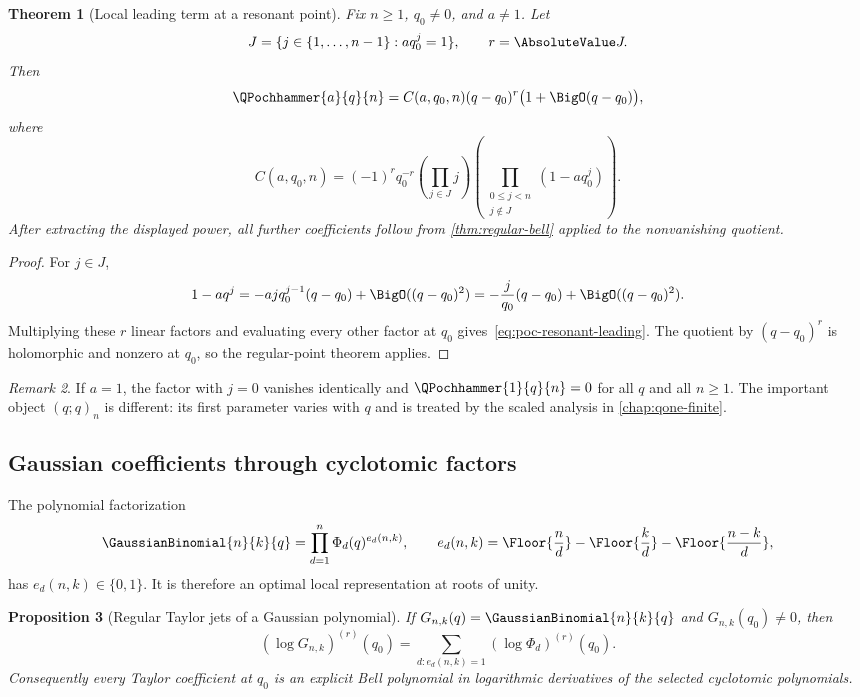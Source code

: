 \documentclass[11pt,oneside]{article}
\newtheorem{theorem}{Theorem}[section]
\newtheorem{proposition}[theorem]{Proposition}
\theoremstyle{definition}
\theoremstyle{remark}
\newtheorem{remark}[theorem]{Remark}
\let\reportsubsection\subsection
\let\section\reportsubsection
\begin{document}
\begin{theorem}[Local leading term at a resonant point]\label{thm:poc-resonance}
Fix $n\ge1$, $q_0\ne0$, and $a\ne1$.  Let
\[
 J=\{j\in\{1,\ldots,n-1\}: aq_0^j=1\},
 \qquad r=\AbsoluteValue J.
\]
Then
\[
 \QPochhammer{a}{q}{n}=C(a,q_0,n)(q-q_0)^r\bigl(1+\BigO(q-q_0)\bigr),
\]
where
\begin{equation}\label{eq:poc-resonant-leading}
 C(a,q_0,n)=(-1)^r q_0^{-r}
 \left(\prod_{j\in J}j\right)
 \left(\prod_{\substack{0\le j<n\\j\notin J}}(1-aq_0^j)\right).
\end{equation}
After extracting the displayed power, all further coefficients follow from
\cref{thm:regular-bell} applied to the nonvanishing quotient.
\end{theorem}

\begin{proof}
For $j\in J$,
\[
 1-aq^j=-ajq_0^{j-1}(q-q_0)+\BigO((q-q_0)^2)
        =-\frac{j}{q_0}(q-q_0)+\BigO((q-q_0)^2).
\]
Multiplying these $r$ linear factors and evaluating every other factor at
$q_0$ gives~\eqref{eq:poc-resonant-leading}.  The quotient by
$(q-q_0)^r$ is holomorphic and nonzero at $q_0$, so the regular-point theorem
applies.
\end{proof}

\begin{remark}
If $a=1$, the factor with $j=0$ vanishes identically and $\QPochhammer{1}{q}{n}=0$ for all
$q$ and all $n\ge1$.  The important object $(q;q)_n$ is different: its first
parameter varies with $q$ and is treated by the scaled analysis in
\cref{chap:qone-finite}.
\end{remark}

\section{Gaussian coefficients through cyclotomic factors}

The polynomial factorization
\begin{equation}\label{eq:cyclotomic-factor}
 \GaussianBinomial{n}{k}{q}=\prod_{d=1}^{n}\Phi_d(q)^{e_d(n,k)},
 \qquad
 e_d(n,k)=\Floor{\frac nd}-\Floor{\frac kd}
          -\Floor{\frac{n-k}{d}},
\end{equation}
has $e_d(n,k)\in\{0,1\}$.  It is therefore an optimal local representation at
roots of unity.

\begin{proposition}[Regular Taylor jets of a Gaussian polynomial]\label{prop:gaussian-regular-jet}
If $G_{n,k}(q)=\GaussianBinomial{n}{k}{q}$ and $G_{n,k}(q_0)\ne0$, then
\[
 \left(\log G_{n,k}\right)^{(r)}(q_0)
 =\sum_{d:e_d(n,k)=1}
   \left(\log\Phi_d\right)^{(r)}(q_0).
\]
Consequently every Taylor coefficient at $q_0$ is an explicit Bell polynomial
in logarithmic derivatives of the selected cyclotomic polynomials.
\end{proposition}
\end{document}
